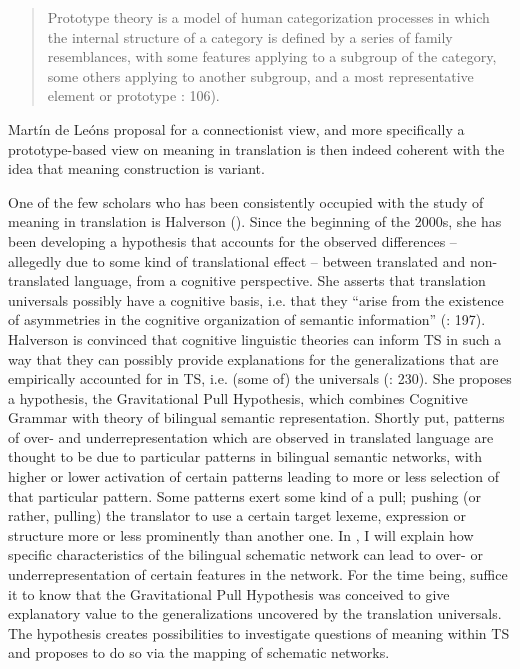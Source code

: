 \begin{quote}
Prototype theory is a model of human categorization processes in which the internal structure of a category is defined by a series of family resemblances, with some features applying to a subgroup of the category, some others applying to another subgroup, and a most representative element or prototype \citealt{rojo_who_2013}: 106).
\end{quote}


Martín de Leóns proposal for a connectionist view, and more specifically a prototype-based view on meaning in translation is then indeed coherent with the idea that meaning construction is variant.



One of the few scholars who has been consistently occupied with the study of meaning in translation is Halverson (\citeyear{halverson_cognitive_2003, shreve_cognitive_2010, de_sutter_developing_2017, rojo_implications_2013}). Since the beginning of the 2000s, she has been developing a hypothesis that accounts for the observed differences – allegedly due to some kind of translational effect – between translated and non-translated language, from a cognitive perspective. She asserts that translation universals possibly have a cognitive basis, i.e. that they “arise from the existence of asymmetries in the cognitive organization of semantic information” (\citealt{halverson_cognitive_2003}: 197). Halverson is convinced that cognitive linguistic theories can inform TS in such a way that they can possibly provide explanations for the generalizations that are empirically accounted for in TS, i.e. (some of) the universals (\citealt{halverson_cognitive_2003}: 230). She proposes a hypothesis, the Gravitational Pull Hypothesis, which combines  Cognitive Grammar with   theory of bilingual semantic representation. Shortly put, patterns of over- and underrepresentation which are observed in translated language are thought to be due to particular patterns in bilingual semantic networks, with higher or lower activation of certain patterns leading to more or less selection of that particular pattern. Some patterns exert some kind of a pull; pushing (or rather, pulling) the translator to use a certain target lexeme, expression or structure more or less prominently than another one. In , I will explain how specific characteristics of the bilingual schematic network can lead to over- or underrepresentation of certain features in the network. For the time being, suffice it to know that the Gravitational Pull Hypothesis was conceived to give explanatory value to the generalizations uncovered by the translation universals. The hypothesis creates possibilities to investigate questions of meaning within TS and proposes to do so via the mapping of schematic networks. 


